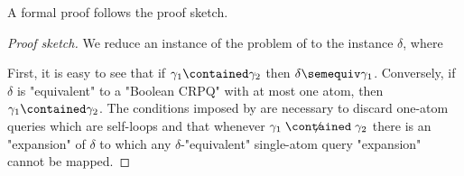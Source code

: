 A formal proof follows the proof sketch.
\begin{proof}[Proof sketch]
	We reduce an instance of the problem of  to the instance
	$\delta$, where
	\begin{center}
    \end{center}
	First, it is easy to see that if $\gamma_1 \contained \gamma_2$ then $\delta \semequiv \gamma_1$. Conversely, if $\delta$ is "equivalent" to a "Boolean CRPQ" with at most one atom, then $\gamma_1 \contained \gamma_2$.
	The conditions imposed by  are necessary to discard one-atom queries which are self-loops and that whenever  $\gamma_1 \centernot{\contained} \gamma_2$ there is an "expansion" of $\delta$ to which any $\delta$-"equivalent" single-atom query "expansion" cannot be mapped.
\end{proof}

